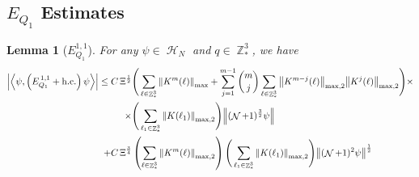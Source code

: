 \documentclass[sn-mathphys, Numbered ,a4paper]{sn-jnl}%
\DeclareMathOperator{\Z}{\mathbb{Z}}
\DeclareMathOperator{\HH}{\mathcal{H}}
\DeclareMathOperator{\NN}{\mathcal{N}}
\newcommand{\half}{\frac{1}{2}}
\newcommand{\eva}[1]{\left\langle #1 \right\rangle}
\theoremstyle{plain}
\newtheorem{lemma}[theorem]{Lemma}
\theoremstyle{definition}
\theoremstyle{remark}
\theoremstyle{plain}
\theoremstyle{definition}
\theoremstyle{remark}
\begin{document}
 \subsection{$E_{Q_1}$ Estimates}
\begin{lemma}[$E_{Q_1}^{1,1}$]
For any $\psi \in \HH_N$ and $q \in \Z^3_*$, we have
\begin{alignat}{2}
     \abs{\eva{\psi,\left(E^{\,1,1}_{Q_1}+\mathrm{h.c.}\right) \psi }}\nonumber
     \leq \; &C\, \begin{aligned}[t]\Xi^{\half}\Bigg( &\sum\limits_{\ell \in \Z^3_*} \norm{K^m(\ell)}_{\mathrm{max}} +\sum\limits_{j=1}^{m-1} {{m}\choose{j}} \sum\limits_{\ell \in \Z^3_*} \norm{K^{m-j}(\ell)}_{\mathrm{max,2}} \norm{K^{j}(\ell)}_{\mathrm{max,2}} \Bigg)\times \nonumber\\ \times \Bigg(&\sum\limits_{\ell_1 \in \Z^3_*} \norm{K(\ell_1)}_{\mathrm{max,2}} \Bigg)\norm { (\NN+1)^{\frac{3}{2}} \psi } \nonumber\\
     \end{aligned}\\
     \;+ &C\,\Xi^{\frac{3}{4}} \left(\sum\limits_{\ell \in \Z^3_*} \norm{K^m(\ell)}_{\mathrm{max,2}}\right) \Bigg(\sum\limits_{\ell_1 \in \Z^3_*} \norm{K(\ell_1)}_{\mathrm{max,2}} \Bigg)  \norm{ (\NN+1)^2\psi}^\half\label{eq:estEQ111}
\end{alignat}
\end{lemma}
\end{document}
